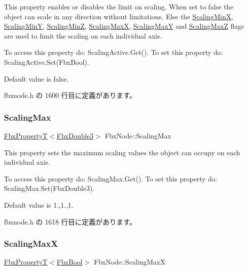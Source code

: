 This property enables or disables the limit on scaling. When set to {\ttfamily false} the object can scale in any direction without limitations. Else the \hyperlink{class_fbx_node_ad47427b4a9e01ab8e08a0a589a0f1c43}{Scaling\+MinX}, \hyperlink{class_fbx_node_ac152b4cc6a615ef0e98b802807f060da}{Scaling\+MinY}, \hyperlink{class_fbx_node_aba3dd61a9e6d3d553fe0a16e1027ba2b}{Scaling\+MinZ}, \hyperlink{class_fbx_node_a2c2926361960045a1719befae430bac0}{Scaling\+MaxX}, \hyperlink{class_fbx_node_a6a515f87577f63a57a7fe8a6c971d9ad}{Scaling\+MaxY} and \hyperlink{class_fbx_node_af4c72a83f64207cbcad432a5f48432af}{Scaling\+MaxZ} flags are used to limit the scaling on each individual axis.

To access this property do\+: Scaling\+Active.\+Get(). To set this property do\+: Scaling\+Active.\+Set(\+Fbx\+Bool).

Default value is false. 

 fbxnode.\+h の 1600 行目に定義があります。

\mbox{\label{class_fbx_node_a530a22a286aa932f665abfa1bbda2ea8}} 
\subsubsection{\texorpdfstring{Scaling\+Max}{ScalingMax}}
{\footnotesize\ttfamily \hyperlink{class_fbx_property_t}{Fbx\+PropertyT}$<$\hyperlink{fbxtypes_8h_ae0a96f14cde566774c7553aa7523b7a7}{Fbx\+Double3}$>$ Fbx\+Node\+::\+Scaling\+Max}

This property sets the maximum scaling values the object can occupy on each individual axis.

To access this property do\+: Scaling\+Max.\+Get(). To set this property do\+: Scaling\+Max.\+Set(\+Fbx\+Double3).

Default value is 1.,1.,1. 

 fbxnode.\+h の 1618 行目に定義があります。

\mbox{\label{class_fbx_node_a2c2926361960045a1719befae430bac0}} 
\subsubsection{\texorpdfstring{Scaling\+MaxX}{ScalingMaxX}}
{\footnotesize\ttfamily \hyperlink{class_fbx_property_t}{Fbx\+PropertyT}$<$\hyperlink{fbxtypes_8h_a92e0562b2fe33e76a242f498b362262e}{Fbx\+Bool}$>$ Fbx\+Node\+::\+Scaling\+MaxX}


